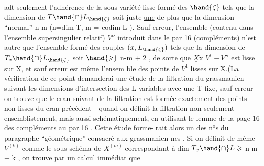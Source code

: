 
adt seulement l'adhérence de la sous-variété lisse formé des $\hand{\zeta}$ tels que
la dimension de $T\hand{\cap}L_{\hand{\zeta}}$ soit juste \uline{une} de plus que la dimension
``normal'' n-m (n=dim T, m = codim L ). Sauf erreur, l'ensemble
(contenu dans l'ensemble supersingulier relatif) $V''$ introduit dans le par
16 (compléments) n'est autre que l'ensemble formé des couples
$(x,L_{\hand{\zeta}})$ tels que la dimension de $T_x\hand{\cap}L_{\hand{\zeta}}$ soit $\hand{\geqslant}$ n-m + 2\hand{)} , de sorte que
$\underline{X}$x $V^1 - V''$ est  lisse sur X, et sauf erreur est même  l'ensem
ble des points de $V^1$ lisses sur X.(La vérification de ce point demanderai
une étude de la filtration du   grassmanien suivant les 
dimensions d'intersection des L variables avec une T fixe, sauf erreur on
trouve que le cran suivant de la filtration est formée exactement des
points non lisses du cran précédent - quand on définit la filtration
 non seulement ensemblistement, mais aussi schématiquement, en utilisant
 le lemme de la page 16 des compléments au par.16 \hand{\unsure{)}}. Cette étude forme-%
 rait alors un des n$^{\text{o}}$s du paragraphe ``géométrique'' consacré aux grassmanien
 nes \hand{)}. Si on définit de même  $V^{(k)}$ comme le sous-schéma de $X^{(m)}$
correspondant à dim $T_x\hand{\cap}L \geqslant$ n-m + k , on trouve par un calcul immédiat
que 
